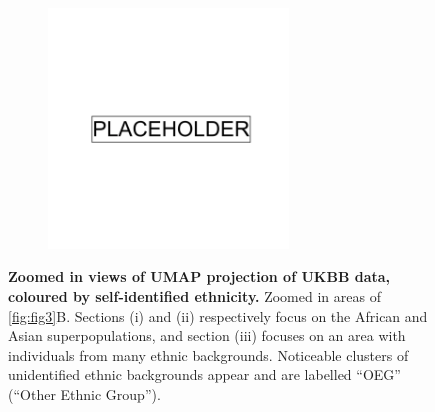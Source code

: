 \newpage

\begin{figure}
    \centering
    \begin{subfigure}{0.8\textwidth}
    \includegraphics[width=0.7\textwidth]{placeholder.png}
    \end{subfigure}
    \caption[Zoomed in views of UMAP projection of UKBB data, coloured by self-identified ethnicity]{\textbf{Zoomed in views of UMAP projection of UKBB data, coloured by self-identified ethnicity.} Zoomed in areas of \ref{fig:fig3}B. Sections (i) and (ii) respectively focus on the African and Asian superpopulations, and section (iii) focuses on an area with individuals from many ethnic backgrounds. Noticeable clusters of unidentified ethnic backgrounds appear and are labelled ``OEG'' (``Other Ethnic Group'').}
    \label{fig:supp_ukbb_zoom}
\end{figure}

\newpage

